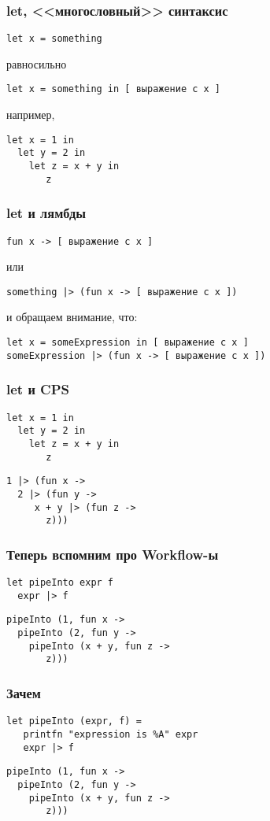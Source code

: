 \documentclass[xetex,mathserif,serif]{beamer}
\begin{document}
	\begin{frame}[fragile]
		\frametitle{let, <<многословный>> синтаксис}
		\begin{verbatim}
let x = something
		\end{verbatim}
		равносильно
		\begin{verbatim}
let x = something in [ выражение c x ]
		\end{verbatim}
		например,
		\begin{verbatim}
let x = 1 in
  let y = 2 in
    let z = x + y in
       z
		\end{verbatim}
	\end{frame}

	\begin{frame}[fragile]
		\frametitle{let и лямбды}
		\begin{verbatim}
fun x -> [ выражение c x ]
		\end{verbatim}
		или
		\begin{verbatim}
something |> (fun x -> [ выражение c x ])
		\end{verbatim}
		и обращаем внимание, что:
		\begin{verbatim}
let x = someExpression in [ выражение c x ]
someExpression |> (fun x -> [ выражение c x ])
		\end{verbatim}
	\end{frame}

	\begin{frame}[fragile]
		\frametitle{let и CPS}
		\begin{verbatim}
let x = 1 in
  let y = 2 in
    let z = x + y in
       z
		\end{verbatim}
		\begin{verbatim}
1 |> (fun x ->
  2 |> (fun y -> 
     x + y |> (fun z -> 
       z)))
		\end{verbatim}
	\end{frame}

	\begin{frame}[fragile]
		\frametitle{Теперь вспомним про Workflow-ы}
		\begin{verbatim}
let pipeInto expr f
  expr |> f
		\end{verbatim}
		\begin{verbatim}
pipeInto (1, fun x ->
  pipeInto (2, fun y -> 
    pipeInto (x + y, fun z -> 
       z)))
		\end{verbatim}
	\end{frame}

	\begin{frame}[fragile]
		\frametitle{Зачем}
		\begin{verbatim}
let pipeInto (expr, f) =
   printfn "expression is %A" expr 
   expr |> f 
		\end{verbatim}
		\begin{verbatim}
pipeInto (1, fun x ->
  pipeInto (2, fun y -> 
    pipeInto (x + y, fun z -> 
       z)))
		\end{verbatim}
	\end{frame}
\end{document}
